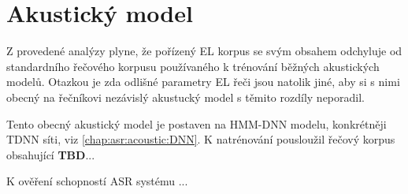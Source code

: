 \section{Akustický model}
\label{chap:construction:am}


Z provedené analýzy plyne, že pořízený EL korpus se svým obsahem odchyluje od standardního řečového korpusu používaného k trénování běžných akustických modelů. Otazkou je zda odlišné parametry EL řeči jsou natolik jiné, aby si s nimi obecný na řečníkovi nezávislý akustucký model s těmito rozdíly neporadil.

Tento obecný akustický model je postaven na HMM-DNN modelu, konkrétněji TDNN síti, viz \ref{chap:asr:acoustic:DNN}. K natrénování pousloužil řečový korpus obsahující \textbf{TBD}...

K ověření schopností ASR systému ...
